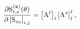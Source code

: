 \begin{align}
        \pdv{\mxS^{(\mathbf{x})}_{t,s}(\vctheta)}{\left[ \mxS_{x_0} \right]_{i,j}} &= \left[ \mxA^t \right]_i \left[ \mxA^s \right]_j^\tr, 
        \label{eq:J derivative Sx0}
\end{align}

